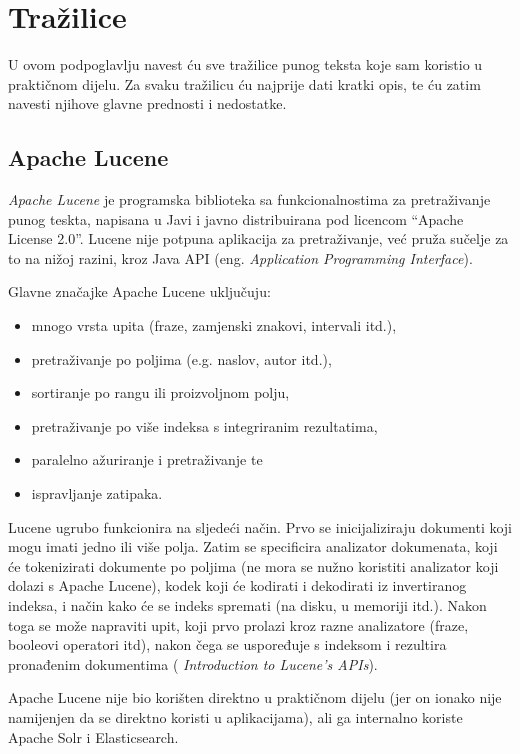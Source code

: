 \documentclass[a4paper,twoside,12pt]{scrreprt}
\begin{document}
\section{Tražilice}

U ovom podpoglavlju navest ću sve tražilice punog teksta koje sam koristio u praktičnom dijelu. Za svaku tražilicu ću najprije dati kratki opis, te ću zatim navesti njihove glavne prednosti i nedostatke.

\subsection{Apache Lucene}

\textit{Apache Lucene} je programska biblioteka sa funkcionalnostima za pretraživanje punog teskta, napisana u Javi i javno distribuirana pod licencom ``Apache License 2.0''. Lucene nije potpuna aplikacija za pretraživanje, već pruža sučelje za to na nižoj razini, kroz Java API (eng. \textit{Application Programming Interface}).

Glavne značajke Apache Lucene uključuju:

\begin{itemize}
  \item mnogo vrsta upita (fraze, zamjenski znakovi, intervali itd.),
  \item pretraživanje po poljima (e.g. naslov, autor itd.),
  \item sortiranje po rangu ili proizvoljnom polju,
  \item pretraživanje po više indeksa s integriranim rezultatima,
  \item paralelno ažuriranje i pretraživanje te
  \item ispravljanje zatipaka.
\end{itemize}

Lucene ugrubo funkcionira na sljedeći način. Prvo se inicijaliziraju dokumenti koji mogu imati jedno ili više polja. Zatim se specificira analizator dokumenata, koji će tokenizirati dokumente po poljima (ne mora se nužno koristiti analizator koji dolazi s Apache Lucene), kodek koji će kodirati i dekodirati iz invertiranog indeksa, i način kako će se indeks spremati (na disku, u memoriji itd.). Nakon toga se može napraviti upit, koji prvo prolazi kroz razne analizatore (fraze, booleovi operatori itd), nakon čega se uspoređuje s indeksom i rezultira pronađenim dokumentima (\cite{lucene} \textit{Introduction to Lucene's APIs}).

Apache Lucene nije bio korišten direktno u praktičnom dijelu (jer on ionako nije namijenjen da se direktno koristi u aplikacijama), ali ga internalno koriste Apache Solr i Elasticsearch.
\end{document}

